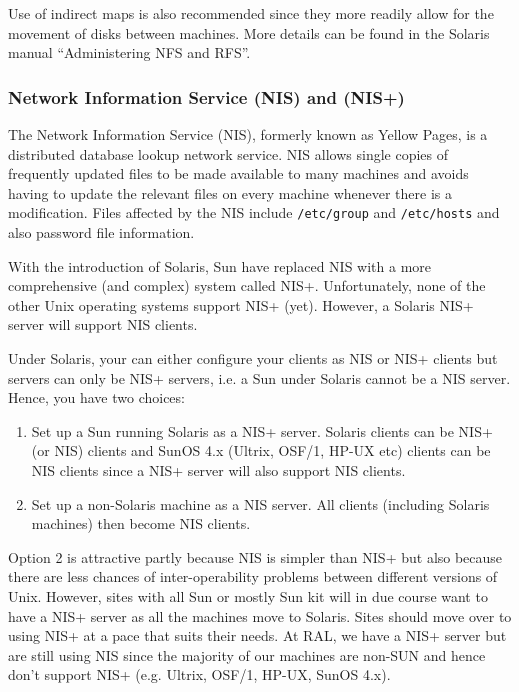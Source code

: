 Use of indirect maps is also recommended since they more readily allow for
the movement of disks between machines. More details can be found in the 
Solaris manual ``Administering NFS and RFS''.


\subsubsection{Network Information Service (NIS) and (NIS+)}

The Network Information Service (NIS), formerly known as Yellow Pages, is a
distributed database lookup network service. NIS allows single copies of
frequently updated files to be made available to many machines and avoids
having to update the relevant files on every machine whenever there is a
modification. Files affected by the NIS include {\tt /etc/group} and 
{\tt /etc/hosts} and also password file information. 

With the introduction of Solaris, Sun have replaced NIS with a more
comprehensive (and complex) system called NIS+. Unfortunately, none
of the other Unix operating systems support NIS+ (yet). However, a
Solaris NIS+ server will support NIS clients.

Under Solaris, your can either configure your clients as NIS or NIS+
clients but servers can only be NIS+ servers, i.e. a Sun under Solaris
cannot be a NIS server. Hence, you have two choices:

\begin{enumerate}

\item Set up a Sun running Solaris as a NIS+ server. Solaris clients can be
NIS+ (or NIS) clients and SunOS 4.x (Ultrix, OSF/1, HP-UX etc) clients can be
NIS clients since a NIS+ server will also support NIS clients. 

\item Set up a non-Solaris machine as a NIS server. All clients (including
Solaris machines) then become NIS clients. 

\end{enumerate}

Option 2 is attractive partly because NIS is simpler than NIS+ but also
because there are less chances of inter-operability problems between different
versions of Unix. However, sites with all Sun or mostly Sun kit will in due
course want to have a NIS+ server as all the machines move to Solaris. Sites
should move over to using NIS+ at a pace that suits their needs. 
At RAL, we have a NIS+ server but are still using NIS since the majority of
our machines are non-SUN and hence don't support NIS+ (e.g. Ultrix, OSF/1,
HP-UX, SunOS 4.x).


